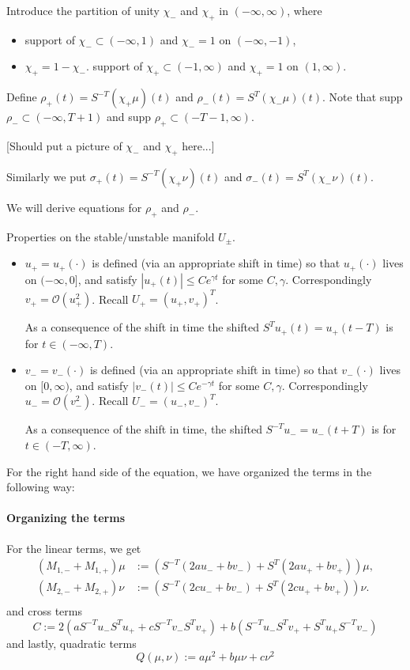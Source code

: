 \documentclass[letterpaper,11pt]{article}
\newcommand{\rmO}{\mathcal{O}}
\numberwithin{equation}{section}
\theoremstyle{plain}
\begin{document}
Introduce the partition of unity $\chi_-$ and $\chi_+$ in $(-\infty, \infty)$, where  
\begin{itemize}

\item  support of $\chi_- \subset (-\infty,1)$ and $\chi_- = 1$ on $(-\infty,-1)$,
\item $\chi_+=1-\chi_-$. support of $\chi_+ \subset (-1,\infty)$ and $\chi_+ = 1$ on $(1,\infty)$.
\end{itemize}
Define $\rho_+(t) = S^{-T}(\chi_+\mu)(t)$ and
$\rho_-(t) = S^{T}(\chi_-\mu)(t)$. Note that supp $\rho_- \subset (-\infty, T+1)$ and supp $\rho_+ \subset (-T-1,\infty)$.

[Should put a picture of $\chi_-$ and $\chi_+$ here...]


Similarly we put $\sigma_+(t) = S^{-T}(\chi_+\nu)(t)$ and $\sigma_-(t) = S^{T}(\chi_-\nu)(t)$.

We will derive equations for $\rho_+$ and $\rho_-$.


Properties on the stable/unstable manifold $U_\pm$.
\begin{itemize}
\item $u_+=u_+(\cdot)$ is defined (via an appropriate shift in time) so that $u_+(\cdot)$ lives on $(-\infty,0]$, and satisfy $|u_+(t)|\le C e^{\gamma t}$ for some $C,\gamma$. Correspondingly $v_+ =  \rmO(u_+^2)$. Recall $U_+ =(u_+,v_+)^T$.

As a consequence of the shift in time
the shifted $S^Tu_+(t)=u_+(t-T)$ is for $t \in (-\infty, T)$.

\item $v_-=v_-(\cdot)$ is defined (via an appropriate shift in time) so that $v_-(\cdot)$ lives on $[0,\infty)$, and satisfy $|v_-(t)|\le C e^{-\gamma t}$ for some $C,\gamma$. Correspondingly $u_- = \rmO(v_-^2)$. Recall $U_- =(u_-,v_-)^T$.

As a consequence of the shift in time, the shifted $S^{-T}u_-
=u_-(t+T)$ is  for $t \in (-T, \infty)$.
\end{itemize}
\pagebreak



For the right hand side of the equation, we have organized the terms in the following way:

\paragraph{Organizing the terms}
For the linear terms, we get 
\begin{align*}
(M_{1,-}+M_{1,+})\mu &:= (S^{-T}(2au_-+bv_-)+S^T(2au_++bv_+))\mu, \\ 
(M_{2,-}+M_{2,+})\nu &:=(S^{-T}(2cu_-+bv_-)+S^T(2cu_++bv_+))\nu. \\
\end{align*}
and cross terms
\[
C:=2(aS^{-T}u_-S^Tu_++cS^{-T}v_-S^Tv_+)+b(S^{-T}u_-S^Tv_++S^Tu_+S^{-T}v_-)
\]
and lastly, quadratic terms
\[
Q(\mu,\nu):=a\mu^2+b\mu \nu+c\nu^2
\]
\end{document}
